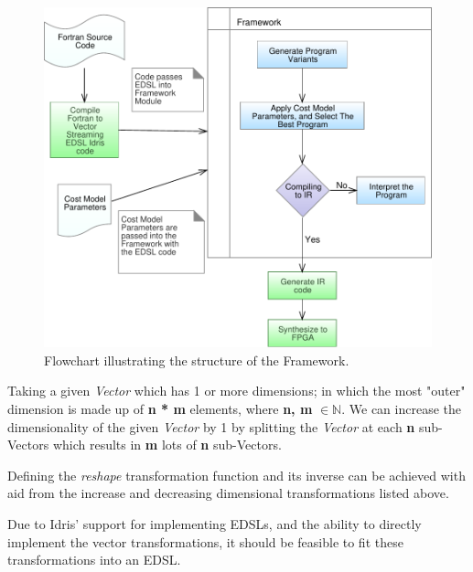 \begin{figure}
\begin{center}
\includegraphics[scale=0.65]{images/flow.pdf}
\caption{Flowchart illustrating the structure of the Framework.}
\label{flow}
\end{center}
\end{figure}

\newpage
{}


Taking a given \textit{Vector} which has 1 or more dimensions; in which the most "outer" dimension is
made up of \textbf{n * m} elements, where \textbf{n, m} $\in \mathbb{N}$. We can increase the dimensionality of
the given \textit{Vector} by 1 by splitting the \textit{Vector} at each \textbf{n} sub-Vectors which results in 
\textbf{m} lots of \textbf{n} sub-Vectors. 


Defining the \textit{reshape} transformation function and its inverse can be achieved with aid from the 
increase and decreasing dimensional transformations listed above.


Due to Idris' support for implementing EDSLs, and the ability to directly implement
the vector transformations, it should be feasible to fit these transformations
into an EDSL. 



